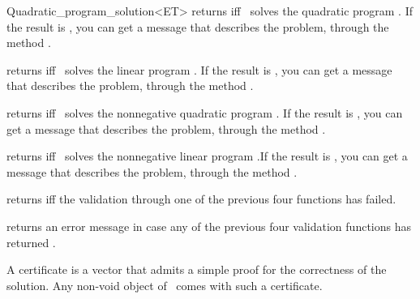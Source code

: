 \begin{ccRefClass}{Quadratic_program_solution<ET>}
{returns  iff \ccVar\ solves the quadratic program . 
If the result is , you can get a message that describes the
problem, through the method .}


{returns  iff \ccVar\ solves the linear program .
If the result is , you can get a message that describes the
problem, through the method . }


{returns  iff \ccVar\ solves the nonnegative 
quadratic program .
If the result is , you can get a message that describes the
problem, through the method . }


{returns  iff \ccVar\ solves the nonnegative
linear program .If the result is , you can get a message that describes the
problem, through the method . }


{returns  iff the validation through one of the 
previous four functions has failed.}

{returns an error message in case any of the
previous four validation functions has returned .}

\begin{ccAdvanced}

A certificate is a vector that admits a simple proof for the 
correctness of the solution. Any non-void object of \ccRefName\ 
comes with such a certificate.


\end{ccAdvanced}
\end{ccRefClass}
